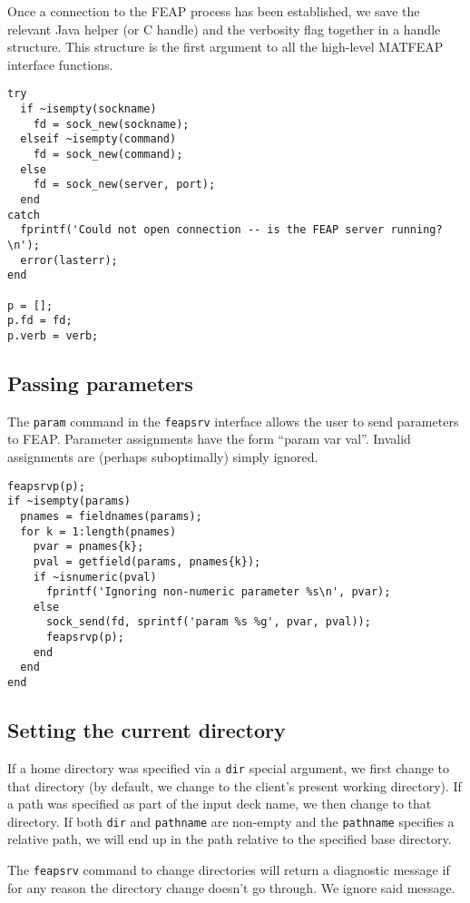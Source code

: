 Once a connection to the FEAP process has been established,
we save the relevant Java helper (or C handle) and the verbosity flag 
together in a handle structure.  This structure is the first argument 
to all the high-level MATFEAP interface functions.

\begin{verbatim}
try
  if ~isempty(sockname)
    fd = sock_new(sockname);
  elseif ~isempty(command)
    fd = sock_new(command);
  else
    fd = sock_new(server, port);
  end
catch
  fprintf('Could not open connection -- is the FEAP server running?\n');
  error(lasterr);
end

p = [];
p.fd = fd;
p.verb = verb;

\end{verbatim}
\subsection{Passing parameters}

The {\tt param} command in the {\tt feapsrv} interface allows the
user to send parameters to FEAP.  Parameter assignments have the
form ``param var val''.  Invalid assignments are (perhaps suboptimally)
simply ignored.

\begin{verbatim}
feapsrvp(p);
if ~isempty(params)
  pnames = fieldnames(params);
  for k = 1:length(pnames)
    pvar = pnames{k};
    pval = getfield(params, pnames{k});
    if ~isnumeric(pval)
      fprintf('Ignoring non-numeric parameter %s\n', pvar);
    else
      sock_send(fd, sprintf('param %s %g', pvar, pval));
      feapsrvp(p);
    end
  end
end

\end{verbatim}
\subsection{Setting the current directory}

If a home directory was specified via a {\tt dir} special
argument, we first change to that directory (by default, we
change to the client's present working directory).  If a path was
specified as part of the input deck name, we then change to that
directory.  If both {\tt dir} and {\tt pathname} are non-empty
and the {\tt pathname} specifies a relative path, we will end up
in the path relative to the specified base directory.

The {\tt feapsrv} command to change directories will return a
diagnostic message if for any reason the directory change doesn't
go through.  We ignore said message.

